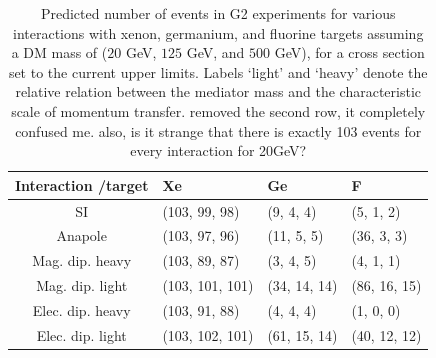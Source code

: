 \documentclass[11pt]{article}
\newcommand{\vgColor}{magenta}
\newcommand{\vg}[1]{{\color{\vgColor} #1}}
\begin{document}
\begin{table}[t] 
\setlength{\extrarowheight}{3pt}
\setlength{\tabcolsep}{12pt}
\begin{center}
\begin{tabular}{|c||m{3cm}|m{3cm}|m{3cm}|}\hline
Interaction /target & Xe & Ge & F\\
\hline\hline 
SI& (103, 99, 98) & (9, 4, 4)& (5, 1, 2)\\ \hline
Anapole& (103, 97, 96)& (11, 5, 5)& (36, 3, 3)\\ \hline
Mag. dip. heavy& (103, 89, 87)& (3, 4, 5)& (4, 1, 1)\\ \hline
Mag. dip. light& (103, 101, 101)& (34, 14, 14)& (86, 16, 15)\\ \hline
Elec. dip. heavy& (103, 91, 88)& (4, 4, 4)& (1, 0, 0)\\ \hline
Elec. dip. light& (103, 102, 101)& (61, 15, 14)& (40, 12, 12)\\ \hline \hline
\end{tabular}
\end{center}
\caption{Predicted number of events in G2 experiments for various interactions with xenon, germanium, and fluorine targets assuming a DM mass of ($20$ GeV, $125$ GeV, and $500$ GeV), for a cross section set to the current upper limits. Labels `light' and `heavy' denote the relative relation between the mediator mass and the characteristic scale of momentum transfer. \vg{removed the second row, it completely confused me. also, is it strange that there is exactly 103 events for every interaction for 20GeV?} }
\label{tab:pred_events}
\end{table}
\end{document}
